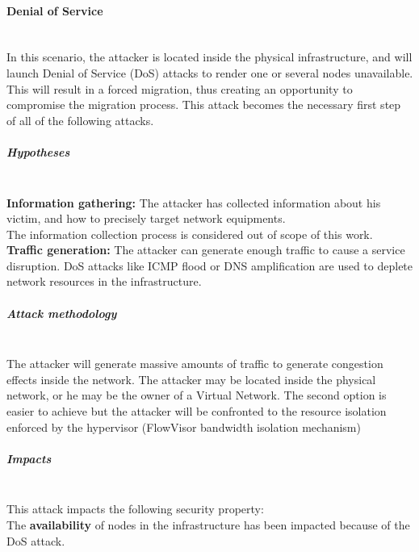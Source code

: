 \paragraph{Denial of Service}\textbf{\\}
In this scenario, the attacker is located inside the physical infrastructure, and will launch Denial of Service (DoS) attacks to render one or several nodes unavailable.
This will result in a forced migration, thus creating an opportunity to compromise the migration process.
This attack becomes the necessary first step of all of the following attacks.

\subparagraph{Hypotheses}\textbf{\\}
\textbf{Information gathering:}
The attacker has collected information about his victim, and how to precisely target network equipments.\\
The information collection process is considered out of scope of this work.\\

\textbf{Traffic generation:}
The attacker can generate enough traffic to cause a service disruption.
DoS attacks like ICMP flood or DNS amplification are used to deplete network resources in the infrastructure.

\subparagraph{Attack methodology}\textbf{\\}
The attacker will generate massive amounts of traffic to generate congestion effects inside the network. The attacker may be located inside the physical network, or he may be the owner of a Virtual Network. The second option is easier to achieve but the attacker will be confronted to the resource isolation enforced by the hypervisor (\ie FlowVisor bandwidth isolation mechanism)


\subparagraph{Impacts}\textbf{\\}
This attack impacts the following security property:\\
The \textbf{availability} of nodes in the infrastructure has been impacted because of the DoS attack.

